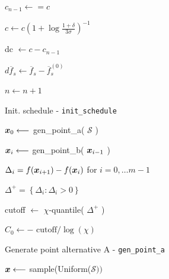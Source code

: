 \begin{algorithm}
{    $c_{n-1} \longleftarrow = c$ \;

    $
    c \longleftarrow c\left(1 + \log\frac{1 + \delta}{3 \sigma}\right)^{-1}
    $

    dc $\longleftarrow c - c_{n-1}$ \;

     {
        $d\overline{f}_s \longleftarrow \overline{f}_s - \overline{f}_s^{(0)}$ \;

        \vspace{5pt}

        {
        }
        
        \vspace{5pt}
    }

    $n \longleftarrow n+1 $ \;

}

\end{algorithm}

\begin{algorithm}
\caption{Init. schedule - \texttt{init\_schedule}}\label{algo:sa}
\vspace{8pt}
\nosemic
\SetAlgoLined


$\boldsymbol{x}_0 \longleftarrow$ gen\_point\_a( $\mathcal{S}$ ) \;

 {
    $\boldsymbol{x}_i \longleftarrow $ gen\_point\_b( $\boldsymbol{x}_{i-1}$ ) \;
}

$\Delta_i = f(\boldsymbol{x}_{i+1}) - f(\boldsymbol{x}_i)$ for $i = 0,\ldots m-1$ \;

$\Delta^+ = \left\lbrace \Delta_i : \Delta_i > 0 \right\rbrace $ \;

cutoff $\longleftarrow$ $\chi$-quantile( $\Delta^+$ ) \;

$C_0 \longleftarrow -\text{ cutoff} / \log(\chi)$ \;

 \;


\end{algorithm}

\begin{algorithm}
\caption{Generate point alternative A - \texttt{gen\_point\_a}}\label{algo:sa}
\vspace{8pt}
\nosemic
\SetAlgoLined
{}

$\boldsymbol{x} \longleftarrow$ sample(Uniform($\mathcal{S})) $ \;


\end{algorithm}

